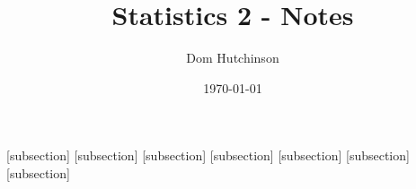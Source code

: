 \documentclass[11pt,a4paper]{article}
\begin{document}
\pagestyle{fancy}
\setlength\parindent{0pt}
\allowdisplaybreaks

\renewcommand{\headrulewidth}{0pt}

\title{Statistics 2 - Notes}
\author{Dom Hutchinson}
\date{\today}
\maketitle

\fancyhead[R]{\today}

[subsection]
[subsection]
[subsection]
[subsection]
[subsection]
[subsection]
[subsection]

\newcommand{\dotprod}[0]{\boldsymbol{\cdot}}
\newcommand{\cosech}[0]{\mathrm{cosech}\ }
\newcommand{\cosec}[0]{\mathrm{cosec}\ }
\newcommand{\sech}[0]{\mathrm{sech}\ }
\newcommand{\prob}[0]{\mathbb{P}}
\newcommand{\nats}[0]{\mathbb{N}}
\newcommand{\cov}[0]{\mathrm{Cov}}
\newcommand{\var}[0]{\mathrm{Var}}
\newcommand{\expect}[0]{\mathbb{E}}
\newcommand{\reals}[0]{\mathbb{R}}
\newcommand{\integers}[0]{\mathbb{Z}}
\newcommand{\indicator}[0]{\mathds{1}}
\newcommand{\nb}[0]{\textit{N.B.} }
\newcommand{\ie}[0]{\textit{i.e.} }
\newcommand{\eg}[0]{\textit{e.g.} }
\newcommand{\X}[0]{\textbf{X}}
\newcommand{\x}[0]{\textbf{x}}
\newcommand{\iid}[0]{\overset{\text{iid}}{\sim}}
\newcommand{\proved}[0]{$\hfill\square$\\}
\end{document}
